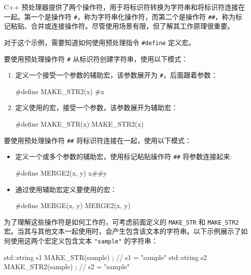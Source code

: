 C++ 预处理器提供了两个操作符，用于将标识符转换为字符串和将标识符连接在一起。第一个是操作符 \verb|#|，称为字符串化操作符，而第二个是操作符 \verb|##|，称为标记粘贴、合并或连接操作符。尽管使用场景有限，但了解其工作原理很重要。


对于这个示例，需要知道如何使用预处理指令 \verb|#define| 定义宏。


要使用预处理操作符 \verb|#| 从标识符创建字符串，使用以下模式：

\begin{enumerate}
\item
定义一个接受一个参数的辅助宏，该参数展开为 \verb|#|，后面跟着参数：

\begin{cpp}
#define MAKE_STR2(x) #x
\end{cpp}

\item
定义使用的宏，接受一个参数，该参数展开为辅助宏：

\begin{cpp}
#define MAKE_STR(x) MAKE_STR2(x)
\end{cpp}
\end{enumerate}

要使用预处理操作符 \verb|##| 将标识符连接在一起，使用以下模式：

\begin{itemize}
\item
定义一个或多个参数的辅助宏，使用标记粘贴操作符 \verb|##| 将参数连接起来:

\begin{cpp}
#define MERGE2(x, y)    x##y
\end{cpp}

\item
通过使用辅助宏定义要使用的宏：

\begin{cpp}
#define MERGE(x, y)     MERGE2(x, y)
\end{cpp}
\end{itemize}


为了理解这些操作符是如何工作的，可考虑前面定义的 \verb|MAKE_STR| 和 \verb|MAKE_STR2| 宏。当其与其他文本一起使用时，会产生包含该文本的字符串。以下示例展示了如何使用这两个宏定义包含文本 \verb|"sample"| 的字符串：

\begin{cpp}
std::string s1 { MAKE_STR(sample) };  // s1 = "sample"
std::string s2 { MAKE_STR2(sample) }; // s2 = "sample"
\end{cpp}

